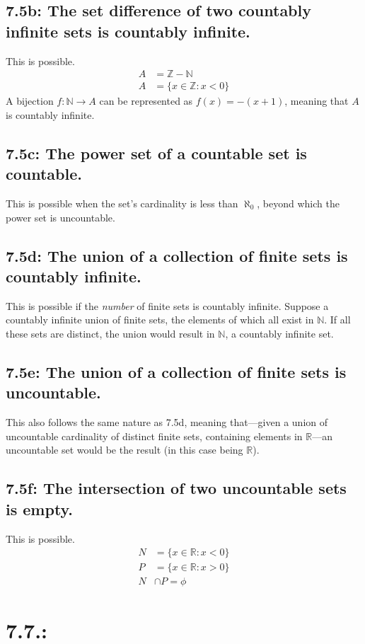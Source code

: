 \documentclass{article}
\begin{document}
\subsection*{7.5b: The set difference of two countably infinite sets is countably infinite.}
This is possible.
\begin{align*}
  A&=\mathbb{Z}-\mathbb{N}\\
  A&=\{x\in\mathbb{Z}:x<0\}
\end{align*}
A bijection $f:\mathbb{N}\rightarrow A$ can be represented as $f(x)=-(x+1)$, meaning that $A$ is countably infinite.
\subsection*{7.5c: The power set of a countable set is countable.}
This is possible when the set's cardinality is less than $\aleph_0$, beyond which the power set is uncountable.
\subsection*{7.5d: The union of a collection of finite sets is countably infinite.}
This is possible if the \textit{number} of finite sets is countably infinite. Suppose a countably infinite union of finite sets, the elements of which all exist in $\mathbb{N}$. If all these sets are distinct, the union would result in $\mathbb{N}$, a countably infinite set.
\subsection*{7.5e: The union of a collection of finite sets is uncountable.}
This also follows the same nature as 7.5d, meaning that---given a union of uncountable cardinality of distinct finite sets, containing elements in $\mathbb{R}$---an uncountable set would be the result (in this case being $\mathbb{R}$).
\subsection*{7.5f: The intersection of two uncountable sets is empty.}
This is possible.
\begin{align*}
  N&=\{x\in\mathbb{R}:x<0\}\\
  P&=\{x\in\mathbb{R}:x>0\}\\
  N&\cap P=\phi
\end{align*}
\section*{7.7.:}
\end{document}
